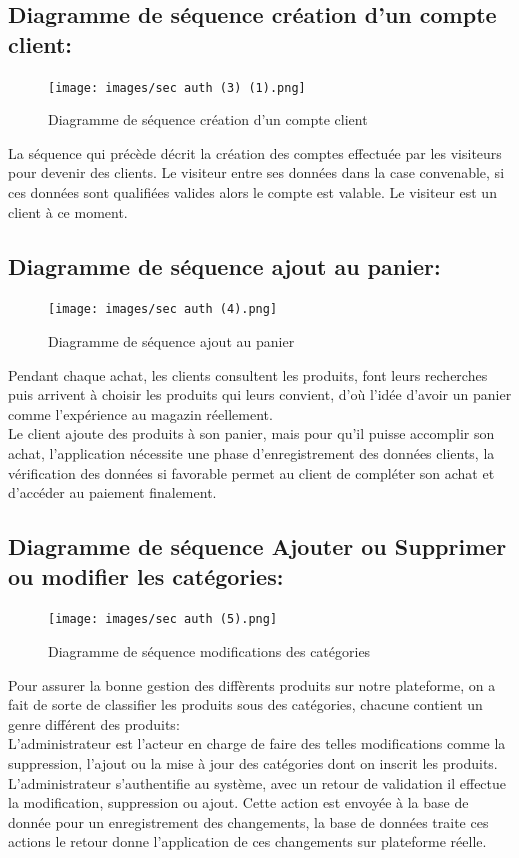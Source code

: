 \documentclass[a4paper,12pt]{report}
\begin{document}
\begin{doublespace}
\begin{doublespace}
\begin{doublespace}
\begin{doublespace}
\begin{doublespace}
\subsection{Diagramme de séquence création d'un compte client:}
\begin{figure}[H]
\begin{center}
 \texttt{[image: images/sec auth (3) (1).png]}
 \caption{Diagramme de séquence création d'un compte client}
 \end{center}
\end{figure}
La séquence  qui précède décrit la création des comptes effectuée par les visiteurs pour devenir des clients. Le visiteur entre ses données dans la case convenable, si ces données sont qualifiées valides alors le compte est valable. Le visiteur est un client à ce moment.
\subsection{Diagramme de séquence ajout au panier:}
\begin{figure}[H]
\begin{center}
 \texttt{[image: images/sec auth (4).png]}
 \caption{Diagramme de séquence ajout au panier}
 \end{center}
\end{figure}
Pendant chaque achat, les clients consultent les produits, font leurs recherches puis arrivent à choisir les produits qui leurs convient, d'où l'idée d'avoir un panier comme l'expérience au magazin réellement. \\Le client ajoute des produits à son panier, mais pour qu'il puisse accomplir son achat, l'application nécessite une phase d'enregistrement des données clients, la vérification des données si favorable permet au client de compléter son achat et d'accéder au paiement finalement.

\subsection{Diagramme de séquence Ajouter ou Supprimer ou modifier les catégories:}
\begin{figure}[H]
\begin{center}
 \texttt{[image: images/sec auth (5).png]}
 \caption{Diagramme de séquence modifications des catégories}
 \end{center}
\end{figure}
Pour assurer la bonne gestion des diffèrents produits sur notre plateforme, on a fait de sorte de classifier les produits sous des catégories, chacune contient un genre différent des produits:\\ L'administrateur est l'acteur en charge de faire des telles modifications comme la suppression, l'ajout ou la mise à jour des catégories dont on inscrit les produits. L'administrateur s'authentifie au système, avec un retour de validation il effectue la modification, suppression ou ajout. Cette action est envoyée à la base de donnée pour un enregistrement des changements, la base de données traite ces actions le retour donne l'application de ces changements sur plateforme réelle.

\end{doublespace}
\end{doublespace}
\end{doublespace}
\end{doublespace}
\end{doublespace}
\end{document}
